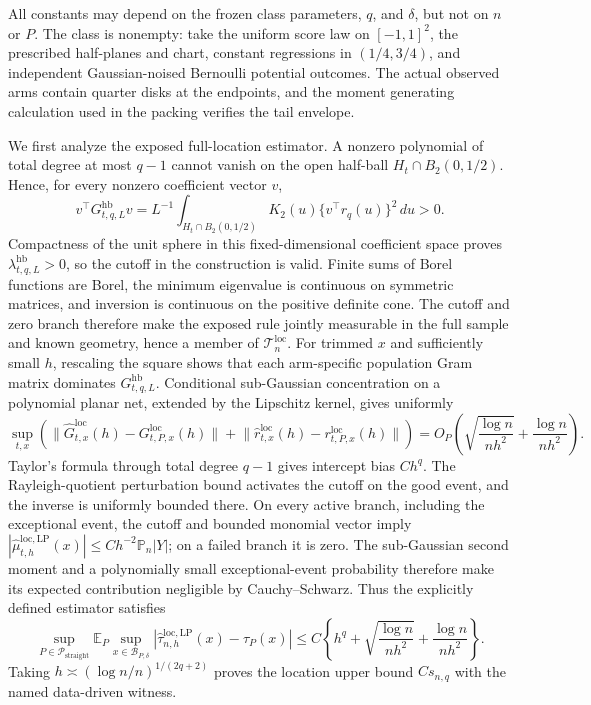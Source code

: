 All constants may depend on the frozen class parameters, \(q\), and \(\delta\),
but not on \(n\) or \(P\).  The class is nonempty: take the uniform score law
on \([-1,1]^2\), the prescribed half-planes and chart, constant regressions in
\((1/4,3/4)\), and independent Gaussian-noised Bernoulli potential outcomes.
The actual observed arms contain quarter disks at the endpoints, and the moment
generating calculation used in the packing verifies the tail envelope.

We first analyze the exposed full-location estimator.  A nonzero polynomial of
total degree at most \(q-1\) cannot vanish on the open half-ball
\(H_t\cap B_2(0,1/2)\).  Hence, for every nonzero coefficient vector \(v\),
\[
 v^\top G^{\mathrm{hb}}_{t,q,L}v
 =L^{-1}\int_{H_t\cap B_2(0,1/2)}K_2(u)
 \{v^\top r_q(u)\}^2\,du>0.
\]
Compactness of the unit sphere in this fixed-dimensional coefficient space
proves \(\lambda^{\mathrm{hb}}_{t,q,L}>0\), so the cutoff in the construction
is valid.  Finite sums of Borel functions are Borel, the minimum eigenvalue is
continuous on symmetric matrices, and inversion is continuous on the positive
definite cone.  The cutoff and zero branch therefore make the exposed rule
jointly measurable in the full sample and known geometry, hence a member of
\(\mathcal T_n^{\mathrm{loc}}\).  For trimmed \(x\) and sufficiently small
\(h\), rescaling the square
shows that each arm-specific population Gram matrix dominates
\(G^{\mathrm{hb}}_{t,q,L}\).  Conditional sub-Gaussian concentration on a
polynomial planar net, extended by the Lipschitz kernel, gives uniformly
\[
 \sup_{t,x}\left(
 \lVert\widehat G^{\mathrm{loc}}_{t,x}(h)-G^{\mathrm{loc}}_{t,P,x}(h)\rVert
 +\lVert\widehat r^{\mathrm{loc}}_{t,x}(h)-r^{\mathrm{loc}}_{t,P,x}(h)\rVert
 \right)
 =O_P\!\left(\sqrt{\frac{\log n}{nh^2}}
 +\frac{\log n}{nh^2}\right).
\]
Taylor's formula through total degree \(q-1\) gives intercept bias \(Ch^q\).
The Rayleigh-quotient perturbation bound activates the cutoff on the good event,
and the inverse is uniformly bounded there.  On every active branch, including
the exceptional event, the cutoff and bounded monomial vector imply
\(|\widehat\mu^{\mathrm{loc},\mathrm{LP}}_{t,h}(x)|
\leq Ch^{-2}\mathbb P_n|Y|\); on a failed branch it is zero.
The sub-Gaussian second moment and a polynomially small exceptional-event
probability therefore make its expected contribution negligible by
Cauchy--Schwarz.  Thus the explicitly defined estimator satisfies
\[
 \sup_{P\in\mathcal P_{\mathrm{straight}}}
 \mathbb E_P\sup_{x\in\mathcal B_{P,\delta}}
 |\widehat\tau^{\mathrm{loc},\mathrm{LP}}_{n,h}(x)-\tau_P(x)|
 \leq C\left\{h^q+\sqrt{\frac{\log n}{nh^2}}+
 \frac{\log n}{nh^2}\right\}.
\]
Taking \(h\asymp(\log n/n)^{1/(2q+2)}\) proves the location upper bound
\(Cs_{n,q}\) with the named data-driven witness.

